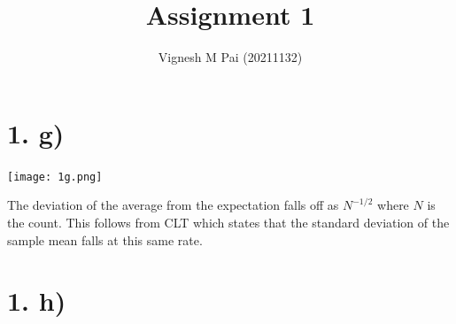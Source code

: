 \documentclass{article}
\title{Assignment 1}
\author{Vignesh M Pai (20211132)}
\begin{document}
\maketitle

\section*{1. g)}

\begin{center}
    \texttt{[image: 1g.png]}    
\end{center}

The deviation of the average from the expectation falls off as $N^{-1/2}$ where $N$ is the count.
This follows from CLT which states that the standard deviation of the sample mean falls at this same rate.

\section*{1. h)}
\end{document}
